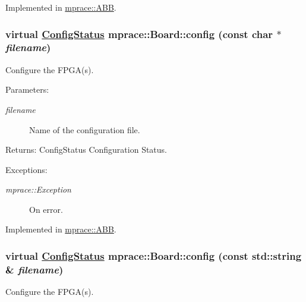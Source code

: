 Implemented in \hyperlink{classmprace_1_1ABB_a14}{mprace::ABB}.\hypertarget{classmprace_1_1Board_a14}{
\subsubsection[config]{\setlength{\rightskip}{0pt plus 5cm}virtual \hyperlink{classmprace_1_1Board_w4}{Config\-Status} mprace::Board::config (const char $\ast$ {\em filename})}}
\label{classmprace_1_1Board_a14}


Configure the FPGA(s). 

\begin{Desc}
\item[Parameters:]
\begin{description}
\item[{\em filename}]Name of the configuration file. \end{description}
\end{Desc}
\begin{Desc}
\item[Returns:]Config\-Status Configuration Status. \end{Desc}
\begin{Desc}
\item[Exceptions:]
\begin{description}
\item[{\em mprace::Exception}]On error.\end{description}
\end{Desc}


Implemented in \hyperlink{classmprace_1_1ABB_a13}{mprace::ABB}.\hypertarget{classmprace_1_1Board_a13}{
\subsubsection[config]{\setlength{\rightskip}{0pt plus 5cm}virtual \hyperlink{classmprace_1_1Board_w4}{Config\-Status} mprace::Board::config (const std::string \& {\em filename})}}
\label{classmprace_1_1Board_a13}


Configure the FPGA(s). 


